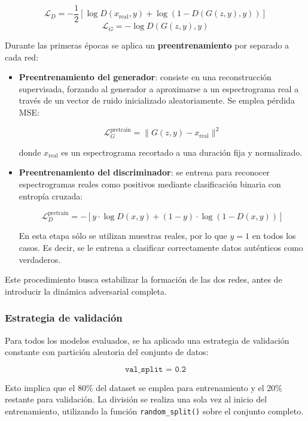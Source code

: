 \[
\mathcal{L}_D = -\frac{1}{2} \left[ \log D(x_{\text{real}}, y) + \log (1 - D(G(z, y), y)) \right]
\]
\[
\mathcal{L}_G = -\log D(G(z, y), y)
\]

\medskip

\noindent Durante las primeras épocas se aplica un \textbf{preentrenamiento} por separado a cada red:

\begin{itemize}
    \item \textbf{Preentrenamiento del generador}: consiste en una reconstrucción supervisada, forzando al generador a aproximarse a un espectrograma real a través de un vector de ruido inicializado aleatoriamente. Se emplea pérdida MSE:
    
    \[
    \mathcal{L}^{\text{pretrain}}_G = \| G(z, y) - x_{\text{real}} \|^2
    \]

    donde $x_{\text{real}}$ es un espectrograma recortado a una duración fija y normalizado.
    
    \item \textbf{Preentrenamiento del discriminador}: se entrena para reconocer espectrogramas reales como positivos mediante clasificación binaria con entropía cruzada:

    \[
    \mathcal{L}^{\text{pretrain}}_D = -\left[ y \cdot \log D(x, y) + (1 - y) \cdot \log(1 - D(x, y)) \right]
    \]

    En esta etapa sólo se utilizan muestras reales, por lo que $y = 1$ en todos los casos. Es decir, se le entrena a clasificar correctamente datos auténticos como verdaderos.
\end{itemize}

Este procedimiento busca estabilizar la formación de las dos redes, antes de introducir la dinámica adversarial completa.


\subsubsection*{Estrategia de validación}

Para todos los modelos evaluados, se ha aplicado una estrategia de validación constante con partición aleatoria del conjunto de datos:

\[
\texttt{val\_split = 0.2}
\]

Esto implica que el 80\% del dataset se emplea para entrenamiento y el 20\% restante para validación. La división se realiza una sola vez al inicio del entrenamiento, utilizando la función \texttt{random\_split()} sobre el conjunto completo.

